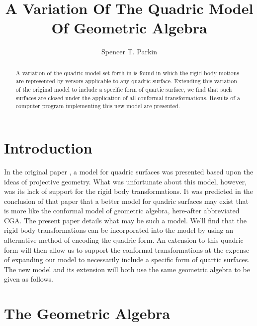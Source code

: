 \documentclass{birkjour}
\theoremstyle{definition}
\theoremstyle{remark}
\numberwithin{equation}{section}
\begin{document}
\title{A Variation Of The Quadric Model\\Of Geometric Algebra}

\author{Spencer T. Parkin}





\begin{abstract}
A variation of the quadric model set forth in \cite{Parkin12} is
found in which the rigid body motions are represented by
versors applicable to any quadric surface.
Extending this variation of the original model to include
a specific form of quartic surface, we find that such surfaces are
closed under the application of all conformal transformations.
Results of a computer program implementing this new model are presented.
\end{abstract}

\maketitle

\section{Introduction}

In the original paper \cite{Parkin12}, a model for quadric surfaces was
presented based upon the ideas of projective geometry.  What was unfortunate
about this model, however, was its lack of support for the rigid body transformations.  It was
predicted in the conclusion of that paper that a better model for quadric
surfaces may exist that is more like the conformal model of geometric algebra, here-after
abbreviated CGA.
The present paper details what may be such a model.  We'll find that the rigid
body transformations can be incorporated into the model by using an alternative
method of encoding the quadric form.  An extension to this quadric form
will then allow us to support the conformal transformations at the expense of
expanding our model to necessarily include a specific form of quartic surfaces.  The
new model and its extension will both use the same geometric algebra to be given as follows.

\section{The Geometric Algebra}
\end{document}

